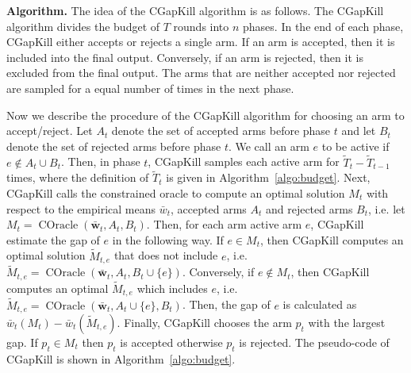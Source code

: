 \documentclass{article}
\newcommand{\junk}[1]{}
\newcommand{\AlgorithmBud}{{\small \textsf{CGapKill}}\xspace}
\DeclareMathOperator{\COracle}{COracle}
\renewcommand{\vec}[1]{\boldsymbol{#1}}
\begin{document}
\textbf{Algorithm.}
The idea of the \AlgorithmBud algorithm is as follows.
The \AlgorithmBud algorithm divides the budget of $T$ rounds into $n$ phases. 
In the end of each phase, \AlgorithmBud either accepts or rejects a single arm. 
If an arm is accepted, then it is included into the final output. 
Conversely, if an arm is rejected, then it is excluded from the final output.
The arms that are neither accepted nor rejected are sampled for a equal number of times in the next phase.
\junk{We see that the major challenge here is to choose a correct arm to accept/reject. 
For decision classes with non-trivial combinatorial structures, one cannot simply accept/reject arms according to their empirical means, since an arm with small expected reward may belong to the optimal set.
We resolve this challenge by using a novel gap estimation method for decision making and demonstrate that \AlgorithmBud can achieve a small probability of error.}

Now we describe the procedure of the \AlgorithmBud algorithm for choosing an arm to accept/reject.
Let $A_t$ denote the set of accepted arms before phase $t$ and let $B_t$ denote the set of rejected arms before phase $t$.
We call an arm $e$ to be active if $e\not\in A_t\cup B_t$.
Then, in phase $t$, \AlgorithmBud samples each active arm for $\tilde T_t -\tilde T_{t-1}$ times, where the definition of $\tilde T_t$ is given in Algorithm~\ref{algo:budget}.
Next, \AlgorithmBud calls the constrained oracle to compute an optimal solution $M_t$ with respect to the empirical means $\bar w_t$, accepted arms $A_t$ and rejected arms $B_t$, i.e. let $M_t = \COracle(\vec {\bar w}_t, A_t,B_t)$.
Then, for each arm active arm $e$, \AlgorithmBud estimate the gap of $e$ in the following way.
If $e\in M_t$, then \AlgorithmBud computes an optimal solution $\tilde M_{t,e}$ that does not include $e$, i.e. $\tilde M_{t,e} = \COracle(\vec {\bar w}_t, A_t, B_t \cup \{e\})$.
Conversely, if $e\not\in M_t$, then \AlgorithmBud computes an optimal $\tilde M_{t,e}$ which includes $e$, i.e. $\tilde M_{t,e} = \COracle(\vec {\bar w}_t, A_t \cup \{e\}, B_t)$.
Then, the gap of $e$ is calculated as $\bar w_t(M_t)-\bar w_t(\tilde M_{t,e})$.
Finally, \AlgorithmBud chooses the  arm $p_t$ with the largest gap.
If $p_t\in M_t$ then $p_t$ is accepted otherwise $p_t$ is rejected.
The pseudo-code of \AlgorithmBud is shown in Algorithm~\ref{algo:budget}.
\end{document}
